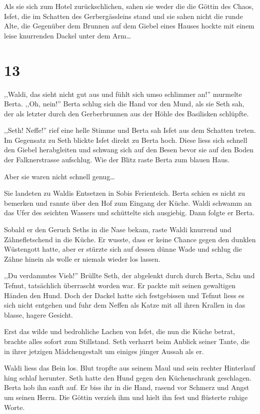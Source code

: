 Als sie sich zum Hotel zurückschlichen, sahen sie weder die die Göttin des Chaos, Isfet, die im Schatten des Gerbergässleins stand und sie sahen nicht die runde Alte, die Gegenüber dem Brunnen auf dem Giebel eines Hauses hockte mit einem leise knurrenden Dackel unter dem Arm\dots

\section*{13}

,,Waldi, das sieht nicht gut aus und fühlt sich umso schlimmer an!'' murmelte Berta. ,,Oh, nein!'' Berta schlug sich die Hand vor den Mund, als sie Seth sah, der als letzter durch den Gerberbrunnen aus der Höhle des Basilisken schlüpfte. 

,,Seth! Neffe!'' rief eine helle Stimme und Berta sah Isfet aus dem Schatten treten. Im Gegensatz zu Seth blickte Isfet direkt zu Berta hoch. Diese liess sich schnell den Giebel herabgleiten und schwang sich auf den Besen bevor sie auf den Boden der Falknerstrasse aufschlug. Wie der Blitz raste Berta zum blauen Haus.

Aber sie waren nicht schnell genug\dots

Sie landeten zu Waldis Entsetzen in Sobis Ferienteich. Berta schien es nicht zu bemerken und rannte über den Hof zum Eingang der Küche. Waldi schwamm an das Ufer des seichten Wassers und schüttelte sich ausgiebig. Dann folgte er Berta.

Sobald er den Geruch Seths in die Nase bekam, raste Waldi knurrend und Zähnefletschend in die Küche. Er wusste, dass er keine Chance gegen den dunklen Wüstengott hatte, aber er stürzte sich auf dessen dünne Wade und schlug die Zähne hinein als wolle er niemals wieder los lassen.

,,Du verdammtes Vieh!'' Brüllte Seth, der abgelenkt durch durch Berta, Schu und Tefnut, tatsächlich überrascht worden war. Er packte mit seinen gewaltigen Händen den Hund. Doch der Dackel hatte sich festgebissen und Tefnut liess es sich nicht entgehen und fuhr dem Neffen als  Katze mit all ihren Krallen in das blasse, hagere Gesicht.

Erst das wilde und bedrohliche Lachen von Isfet, die nun die Küche betrat, brachte alles sofort zum Stillstand. Seth verharrt beim Anblick seiner Tante, die in ihrer jetzigen Mädchengestalt um einiges jünger Aussah als er.

Waldi liess das Bein los. Blut tropfte aus seinem Maul und sein rechter Hinterlauf hing schlaf herunter. Seth hatte den Hund gegen den Küchenschrank geschlagen. Berta hob ihn sanft auf. Er biss ihr in die Hand, rasend vor Schmerz und Angst um seinen Herrn. Die Göttin verzieh ihm und hielt ihn fest und flüsterte ruhige Worte.

